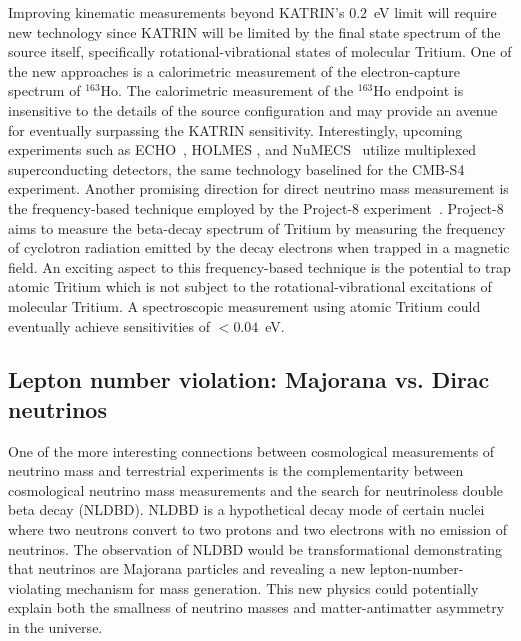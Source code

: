Improving kinematic measurements beyond KATRIN's $0.2$~eV limit will require new technology since \mbox{KATRIN} will be limited by the final state spectrum of the source itself, specifically rotational-vibrational states of molecular Tritium. One of the new approaches is a calorimetric measurement of the electron-capture spectrum of $^{163}$Ho. The calorimetric measurement of the $^{163}$Ho endpoint is insensitive to the details of the source configuration and may provide an avenue for eventually surpassing the KATRIN sensitivity. Interestingly, upcoming experiments such as ECHO~\cite{Eliseev:2015pda}, HOLMES \cite{Ceriale:2015mtn}, and NuMECS~\cite{Croce:2015kwa} utilize multiplexed superconducting detectors, the same technology baselined for the CMB-S4 experiment. Another promising direction for direct neutrino mass measurement is the frequency-based technique employed by the Project-8 experiment~\cite{Asner:2014cwa}. Project-8 aims to measure the beta-decay spectrum of Tritium by measuring the frequency of cyclotron radiation emitted by the decay electrons when trapped in a magnetic field. An exciting aspect to this frequency-based technique is the potential to trap atomic Tritium which is not subject to the rotational-vibrational excitations of molecular Tritium. A spectroscopic measurement using atomic Tritium could eventually achieve sensitivities of $<0.04$~eV. 


\subsection{Lepton number violation: Majorana vs. Dirac neutrinos}
One of the more interesting connections between cosmological measurements of neutrino mass and terrestrial experiments is the complementarity between cosmological neutrino mass measurements and the search for neutrinoless double beta decay (NLDBD). NLDBD is a hypothetical decay mode of certain nuclei where two neutrons convert to two protons and two electrons with no emission of neutrinos. The observation of NLDBD would be transformational demonstrating that neutrinos are Majorana particles and revealing a new lepton-number-violating mechanism for mass generation. This new physics could potentially explain both the smallness of neutrino masses and matter-antimatter asymmetry in the universe.

